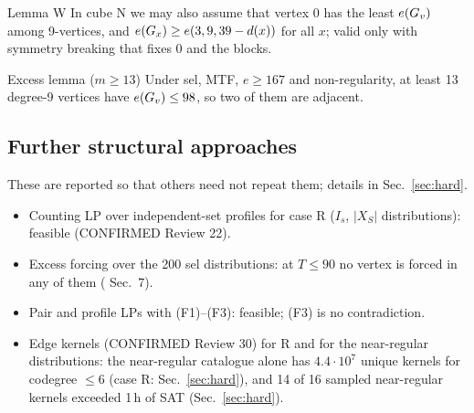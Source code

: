 \begin{namedthm}{Lemma W}
In cube N we may also assume that vertex 0 has the least $e(G_{v})$ among 9-vertices, and
$e(G_{x}) \ge e(3,9,39-d(x))$ for all $x$; valid only with symmetry breaking that fixes 0 and the blocks.
\end{namedthm}

\begin{namedthm}{Excess lemma ($m \ge 13$)}
Under sel, MTF, $e \ge 167$ and non-regularity, at least 13 degree-9 vertices have
$e(G_{v}) \le 98$, so two of them are adjacent.
\end{namedthm}

\subsection{Further structural approaches}\label{sec:failed}
These are reported so that others need not repeat them; details in Sec.~\ref{sec:hard}.
\begin{itemize}
\item Counting LP over independent-set profiles for case R ($I_s$, $|X_S|$ distributions): feasible (CONFIRMED Review 22).
\item Excess forcing over the 200 sel distributions: at $T \le 90$ no vertex is forced in any of them ( Sec.~7).
\item Pair and profile LPs with (F1)--(F3): feasible; (F3) is no contradiction.
\item Edge kernels (CONFIRMED Review 30) for R and for the near-regular distributions: the near-regular
  catalogue alone has $4.4\cdot 10^{7}$ unique kernels for codegree $\le 6$ (case R: Sec.~\ref{sec:hard}), and 14 of 16 sampled near-regular kernels exceeded 1\,h of SAT (Sec.~\ref{sec:hard}).
\end{itemize}
